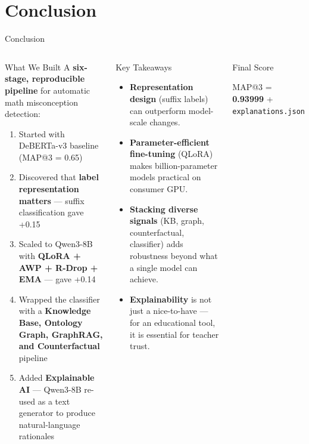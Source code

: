 \documentclass[aspectratio=169]{beamer}
\begin{document}
\section{Conclusion}

\begin{frame}{Conclusion}
\begin{columns}[T]
\begin{block}{What We Built}
A \textbf{six-stage, reproducible pipeline} for automatic math misconception detection:
\begin{enumerate}
  \item Started with DeBERTa-v3 baseline (MAP@3 = 0.65)
  \item Discovered that \textbf{label representation matters} --- suffix classification gave +0.15
  \item Scaled to Qwen3-8B with \textbf{QLoRA + AWP + R-Drop + EMA} --- gave +0.14
  \item Wrapped the classifier with a \textbf{Knowledge Base, Ontology Graph, GraphRAG, and Counterfactual} pipeline
  \item Added \textbf{Explainable AI} --- Qwen3-8B re-used as a text generator to produce natural-language rationales
\end{enumerate}
\end{block}
\begin{block}{Key Takeaways}
\begin{itemize}
  \item \textbf{Representation design} (suffix labels) can outperform model-scale changes.
  \item \textbf{Parameter-efficient fine-tuning} (QLoRA) makes billion-parameter models practical on consumer GPU.
  \item \textbf{Stacking diverse signals} (KB, graph, counterfactual, classifier) adds robustness beyond what a single model can achieve.
  \item \textbf{Explainability} is not just a nice-to-have --- for an educational tool, it is essential for teacher trust.
\end{itemize}
\end{block}
\vspace{6pt}
\begin{exampleblock}{Final Score}
\begin{center}
\Large MAP@3 = \textbf{0.93999} \quad + \texttt{explanations.json}
\end{center}
\end{exampleblock}
\end{columns}
\end{frame}
\end{document}
